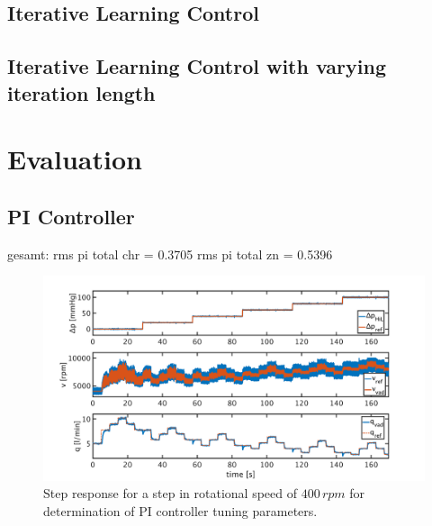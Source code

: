 \subsection{Iterative Learning Control}

\subsection{Iterative Learning Control with varying iteration length}

\section{Evaluation}
\subsection{PI Controller}
gesamt:
rms pi total chr = 0.3705
rms pi total zn = 0.5396
\begin{figure}[ht]
  \centering
  \includegraphics[width=\textwidth]{images/chapt_5/pi_contr_chr.pdf}
  \caption[Step response for determination of PI controller tuning parameters]{Step response for a step in rotational speed of $400\,rpm$ for determination of PI controller tuning parameters.}
  \label{fig:pi_contr_chr}
\end{figure}


